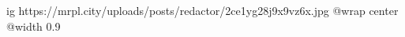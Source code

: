  
 
 
 
 

\ifcmt
  ig https://mrpl.city/uploads/posts/redactor/2ce1yg28j9x9vz6x.jpg
  @wrap center
  @width 0.9
\fi
